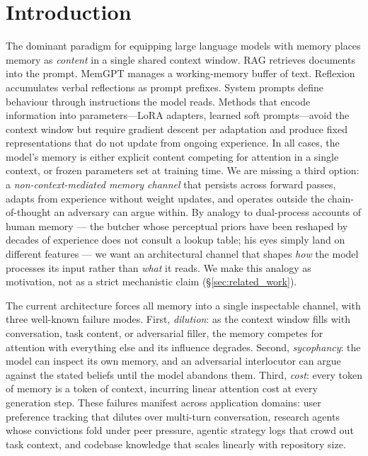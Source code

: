 \section{Introduction}

The dominant paradigm for equipping large language models with memory places memory as \emph{content} in a single shared context window. RAG retrieves documents into the prompt. MemGPT manages a working-memory buffer of text. Reflexion accumulates verbal reflections as prompt prefixes. System prompts define behaviour through instructions the model reads. Methods that encode information into parameters---LoRA adapters, learned soft prompts---avoid the context window but require gradient descent per adaptation and produce fixed representations that do not update from ongoing experience. In all cases, the model's memory is either explicit content competing for attention in a single context, or frozen parameters set at training time. We are missing a third option: a \emph{non-context-mediated memory channel} that persists across forward passes, adapts from experience without weight updates, and operates outside the chain-of-thought an adversary can argue within. By analogy to dual-process accounts of human memory \citep{graf1985implicit, schacter1987implicit} --- the butcher whose perceptual priors have been reshaped by decades of experience does not consult a lookup table; his eyes simply land on different features --- we want an architectural channel that shapes \emph{how} the model processes its input rather than \emph{what} it reads. We make this analogy as motivation, not as a strict mechanistic claim (\S\ref{sec:related_work}).

The current architecture forces all memory into a single inspectable channel, with three well-known failure modes. First, \emph{dilution}: as the context window fills with conversation, task content, or adversarial filler, the memory competes for attention with everything else and its influence degrades. Second, \emph{sycophancy}: the model can inspect its own memory, and an adversarial interlocutor can argue against the stated beliefs until the model abandons them. Third, \emph{cost}: every token of memory is a token of context, incurring linear attention cost at every generation step. These failures manifest across application domains: user preference tracking that dilutes over multi-turn conversation, research agents whose convictions fold under peer pressure, agentic strategy logs that crowd out task context, and codebase knowledge that scales linearly with repository size.

